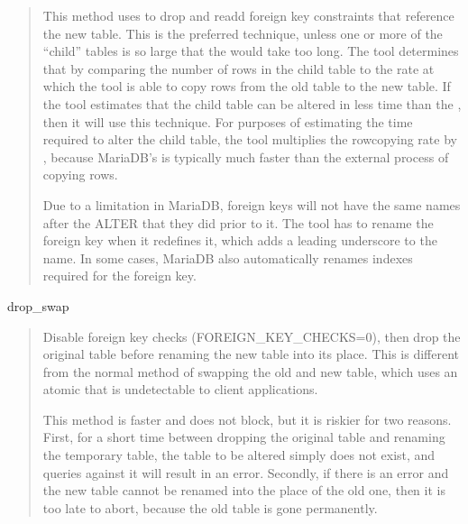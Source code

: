 \documentclass[letterpaper,10pt,english]{sphinxmanual}
\begin{document}
\begin{fulllineitems}
\begin{quote}
\sphinxAtStartPar
This method uses  to drop and re\sphinxhyphen{}add foreign key constraints that
reference the new table.  This is the preferred technique, unless one or more of
the “child” tables is so large that the  would take too long.  The tool
determines that by comparing the number of rows in the child table to the rate
at which the tool is able to copy rows from the old table to the new table. If
the tool estimates that the child table can be altered in less time than the
{\hyperref[\detokenize{mariadb-schema-change:cmdoption-mariadb-schema-change-chunk-time}]{}}, then it will use this technique.  For purposes of estimating
the time required to alter the child table, the tool multiplies the row\sphinxhyphen{}copying
rate by {\hyperref[\detokenize{mariadb-schema-change:cmdoption-mariadb-schema-change-chunk-size-limit}]{}}, because MariaDB’s  is typically
much faster than the external process of copying rows.

\sphinxAtStartPar
Due to a limitation in MariaDB, foreign keys will not have the same names after
the ALTER that they did prior to it. The tool has to rename the foreign key
when it redefines it, which adds a leading underscore to the name. In some
cases, MariaDB also automatically renames indexes required for the foreign key.
\end{quote}

\sphinxAtStartPar
drop\_swap
\begin{quote}

\sphinxAtStartPar
Disable foreign key checks (FOREIGN\_KEY\_CHECKS=0), then drop the original table
before renaming the new table into its place. This is different from the normal
method of swapping the old and new table, which uses an atomic  that is
undetectable to client applications.

\sphinxAtStartPar
This method is faster and does not block, but it is riskier for two reasons.
First, for a short time between dropping the original table and renaming the
temporary table, the table to be altered simply does not exist, and queries
against it will result in an error.  Secondly, if there is an error and the new
table cannot be renamed into the place of the old one, then it is too late to
abort, because the old table is gone permanently.


\end{quote}
\end{fulllineitems}
\end{document}
